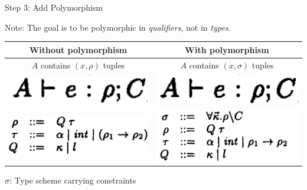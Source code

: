 \documentclass{beamer}
\begin{document}
\begin{frame}{Step 3: Add Polymorphism}

Note: The goal is to be polymorphic in \emph{qualifiers}, not in \emph{types}.

\bigskip

\begin{center}
\renewcommand{\arraystretch}{1.5}
\begin{tabular}{|c | c|}
\hline
\textbf{Without polymorphism} & \textbf{With polymorphism} \\
\hline
$A$ contains $(x, \rho)$ tuples & $A$ contains $(x, \sigma)$ tuples\\
\hline
\includegraphics[scale=0.65]{paper_constraint_judgment_qualifs.png} & \includegraphics[scale=0.65]{paper_constraint_judgment_qualifs.png}\\
\hline  
\includegraphics[scale=0.65]{paper_figure_3_no_label.png} & \includegraphics[scale=0.65]{paper_poly_types_grammar.png} \\
\hline
\end{tabular}
\renewcommand{\arraystretch}{1.0}
\end{center}

\bigskip

$\sigma$: Type scheme carrying constraints

\end{frame}
\end{document}
